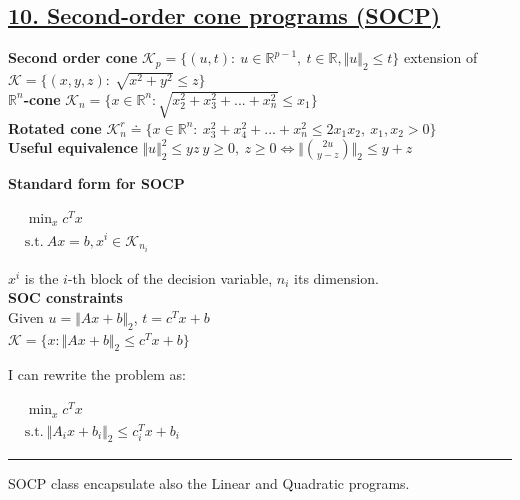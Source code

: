 \documentclass[a4paper]{article}
\begin{document}
\subsection*{\underline{10. Second-order cone programs (SOCP)}}
\textbf{Second order cone} $\mathcal{K}_p=\{(u,t): \ u\in\mathbb{R}^{p-1}, \ t\in\mathbb{R}, \Vert u \Vert_2\le{t}\}$ extension of 
$\mathcal{K}=\{(x,y,z): \ \sqrt{x^2+y^2}\le{z}\}$\\
\textbf{$\mathbb{R}^n$-cone} $\mathcal{K}_n =\{x\in\mathbb{R}^n: \sqrt{x_2^2+x_3^2+...+x_n^2}\le{x_1}\}$\\
\textbf{Rotated cone} 
$\mathcal{K}_n^r\doteq\{x\in\mathbb{R}^n: \ x_3^2+x_4^2+...+x_n^2\le2x_1{x_2}, \ x_1, x_2 >0\}$\\
\textbf{Useful equivalence} $\Vert u \Vert_2^2 \le yz \ y\ge0, \ z\ge0 \iff \Vert \binom{2u}{y-z} \Vert_2 \le y+z$
\begin{multicols}{3}
    \noindent
    \textbf{Standard form for SOCP}
    \begin{center}
        $\begin{aligned}
            &\min_{x} c^T{x}\\
            &\text{s.t.} \ Ax=b, x^i \in \mathcal{K}_{n_i}
        \end{aligned}$
    \end{center}
    $x^i$ is the $i$-th block of the decision variable, $n_i$ its dimension.
    \newcolumn\\
    \textbf{SOC constraints}\\
    Given $u=\Vert Ax+b \Vert_2$, $t=c^T{x}+b$\\

    $\mathcal{K}=\{x: \Vert Ax+b \Vert_2 \le c^T{x}+b\}$
    \begin{center}
    \end{center}
    \newcolumn
    I can rewrite the problem as:
    \begin{center}
        $\begin{aligned}
            &\min_{x} {c^T{x}}\\
            &\text{s.t.} \ \Vert A_i{x}+b_i \Vert_2 \le c_i^T{x}+b_i
        \end{aligned}$
    \end{center}
    \hrule
    SOCP class encapsulate also the Linear and Quadratic programs.
\end{multicols}
\end{document}
